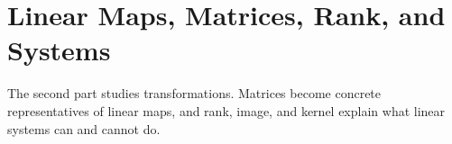 \part{Linear Maps, Matrices, Rank, and Systems}

The second part studies transformations. Matrices become concrete
representatives of linear maps, and rank, image, and kernel explain what linear
systems can and cannot do.
